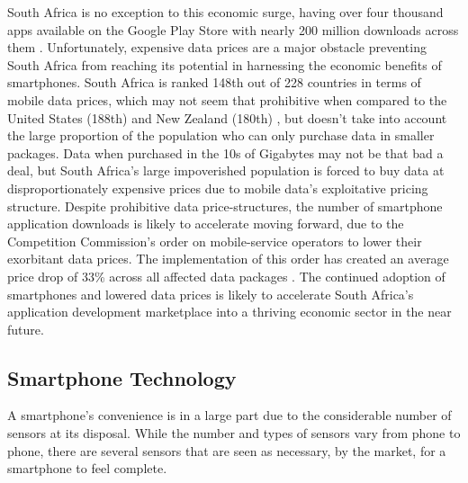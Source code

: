 South Africa is no exception to this economic surge, having over four thousand apps available on the Google Play Store with nearly 200 million downloads across them \cite{42matters}. Unfortunately, expensive data prices are a major obstacle preventing South Africa from reaching its potential in harnessing the economic benefits of smartphones. South Africa is ranked 148th out of 228 countries in terms of mobile data prices\cite{Cable.co.uk}, which may not seem that prohibitive when compared to the United States (188th) and New Zealand (180th) \cite{Cable.co.uk}, but doesn't take into account the large proportion of the population who can only purchase data in smaller packages. Data when purchased in the 10s of Gigabytes may not be that bad a deal, but South Africa's large impoverished population is forced to buy data at disproportionately expensive prices due to mobile data's exploitative pricing structure. 
Despite prohibitive data price-structures, the number of smartphone application downloads is likely to accelerate moving forward, due to the Competition Commission's order on mobile-service operators to lower their exorbitant data prices. The implementation of this order has created an average price drop of 33\% across all affected data packages \cite{Bottomley2020}. The continued adoption of smartphones and lowered data prices is likely to accelerate South Africa's application development marketplace into a thriving economic sector in the near future.

\subsection{Smartphone Technology}
A smartphone's convenience is in a large part due to the considerable number of sensors at its disposal. While the number and types of sensors vary from phone to phone, there are several sensors that are seen as necessary, by the market, for a smartphone to feel complete. 

